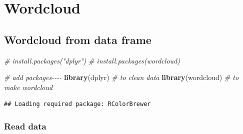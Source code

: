\documentclass[
]{book}
\newenvironment{Shaded}{\begin{snugshade}}{\end{snugshade}}
\newcommand{\CommentTok}[1]{\textcolor[rgb]{0.56,0.35,0.01}{\textit{#1}}}
\newcommand{\FunctionTok}[1]{\textcolor[rgb]{0.13,0.29,0.53}{\textbf{#1}}}
\newcommand{\NormalTok}[1]{#1}
\begin{document}
\hypertarget{wordcloud}{%
\chapter{Wordcloud}\label{wordcloud}}

\hypertarget{wordcloud-from-data-frame}{%
\section{Wordcloud from data frame}\label{wordcloud-from-data-frame}}

\begin{Shaded}
\begin{Highlighting}[]
\CommentTok{\# install.packages("dplyr")}
\CommentTok{\# install.packages(\textquotesingle{}wordcloud\textquotesingle{})}

\CommentTok{\# add packages{-}{-}{-}{-}}
\FunctionTok{library}\NormalTok{(dplyr) }\CommentTok{\# to clean data}
\FunctionTok{library}\NormalTok{(wordcloud) }\CommentTok{\# to make wordcloud}
\end{Highlighting}
\end{Shaded}

\begin{verbatim}
## Loading required package: RColorBrewer
\end{verbatim}

\hypertarget{read-data}{%
\subsection{Read data}\label{read-data}}
\end{document}
